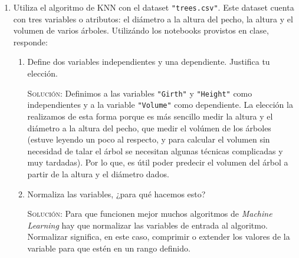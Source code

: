\documentclass[letterpaper,11pt]{article}
\begin{document}
\begin{enumerate}
\begin{proof}
\begin{align*}
            &= ad - a\lambda - d\lambda + \lambda^2 - bc
            && \text{álgebra} \\
            &= ad - (a + d)\lambda + \lambda^2 - bc
            && \text{factorizando} \\
            &= \lambda^2 - (a + d)\lambda + (ad - bc)
            && \text{reacomodando la expresión} \\
            &= \lambda^2 - tr(A)\lambda + det(A)
            && \text{definición de tr(A) y det(A)} \\
            &= \lambda^2 - \lambda tr(A) + det(A) 
            && \text{conmutatividad de la multiplicación}
        \end{align*}

        Por lo tanto, el polinomio característico de la matriz $A$ puede ser 
        expresado como 
        \begin{equation*}
            p(\lambda) = \lambda^2 - \lambda tr(A) + det(A)
        \end{equation*}
    \end{proof}

    \item Utiliza el algoritmo de KNN con el dataset \texttt{"trees.csv"}. Este 
    dataset cuenta con tres variables o atributos: el diámetro a la altura del 
    pecho, la altura y el volumen de varios árboles. Utilizándo los notebooks 
    provistos en clase, responde:
    \begin{enumerate}
        \item Define dos variables independientes y una dependiente. Justifica 
        tu elección.

        \textsc{Solución:} Definimos a las variables \texttt{"Girth"} y 
        \texttt{"Height"} como independientes y a la variable \texttt{"Volume"}
        como dependiente. La elección la realizamos de esta forma porque es 
        más sencillo medir la altura y el diámetro a la altura del pecho, que 
        medir el volúmen de los árboles (estuve leyendo un poco al respecto, y 
        para calcular el volumen sin necesidad de talar el árbol se necesitan 
        algunas técnicas complicadas y muy tardadas). Por lo que, es útil poder 
        predecir el volumen del árbol a partir de la altura y el diámetro dados.

        \item Normaliza las variables, ¿para qué hacemos esto?

        \textsc{Solución:} Para que funcionen mejor muchos algoritmos de 
        \textit{Machine Learning} hay que normalizar las variables de entrada 
        al algoritmo. Normalizar significa, en este caso, comprimir o extender 
        los valores de la variable para que estén en un rango definido.


\end{enumerate}
\end{enumerate}
\end{document}
